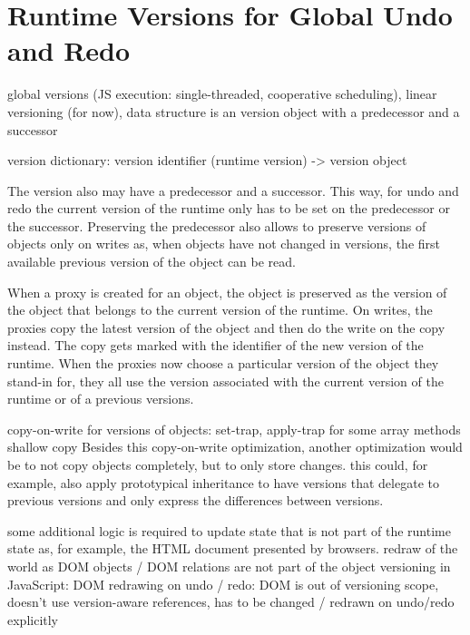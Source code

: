 \section{Runtime Versions for Global Undo and Redo} \label{sec:IMPLEMENTATION:3}


global versions (JS execution: single-threaded, cooperative scheduling), linear versioning (for now), data structure is an version object with a predecessor and a successor

version dictionary: version identifier (runtime version) -> version object

The version also may have a predecessor and a successor.
This way, for undo and redo the current version of the runtime only has to be set on the predecessor or the successor.
Preserving the predecessor also allows to preserve versions of objects only on writes as, when objects have not changed in versions, the first available previous version of the object can be read.



When a proxy is created for an object, the object is preserved as the version of the object that belongs to the current version of the runtime.
On writes, the proxies copy the latest version of the object and then do the write on the copy instead.
The copy gets marked with the identifier of the new version of the runtime.
When the proxies now choose a particular version of the object they stand-in for, they all use the version associated with the current version of the runtime or of a previous versions.

copy-on-write for versions of objects: set-trap, apply-trap for some array methods
shallow copy
Besides this copy-on-write optimization, another optimization would be to not copy objects completely, but to only store changes.
this could, for example, also apply prototypical inheritance to have versions that delegate to previous versions and only express the differences between versions.



some additional logic is required to update state that is not part of the runtime state as, for example, the HTML document presented by browsers.
redraw of the world as DOM objects / DOM relations are not part of the object versioning in JavaScript: DOM redrawing on undo / redo: DOM is out of versioning scope, doesn’t use version-aware references, has to be changed / redrawn on undo/redo explicitly




